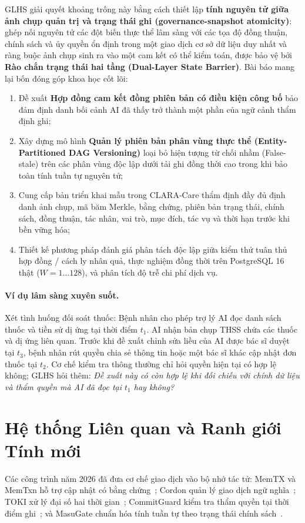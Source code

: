\documentclass[11pt]{article}
\begin{document}
GLHS giải quyết khoảng trống này bằng cách thiết lập \textbf{tính nguyên tử giữa ảnh chụp quản trị và trạng thái ghi (governance-snapshot atomicity)}: ghép nối nguyên tử các đột biến thực thể lâm sàng với các tọa độ đồng thuận, chính sách và ủy quyền ổn định trong một giao dịch cơ sở dữ liệu duy nhất và ràng buộc ảnh chụp sinh ra vào một cam kết có thể kiểm toán, được bảo vệ bởi \textbf{Rào chắn trạng thái hai tầng (Dual-Layer State Barrier)}. Bài báo mang lại bốn đóng góp khoa học cốt lõi:
\begin{enumerate}
    \item Đề xuất \textbf{Hợp đồng cam kết đồng phiên bản có điều kiện công bố} bảo đảm định danh bối cảnh AI đã thấy trở thành một phần của ngữ cảnh thẩm định ghi;
    \item Xây dựng mô hình \textbf{Quản lý phiên bản phân vùng thực thể (Entity-Partitioned DAG Versioning)} loại bỏ hiện tượng từ chối nhầm (False-stale) trên các phân vùng độc lập dưới tải ghi đồng thời cao trong khi bảo toàn tính tuần tự nguyên tử;
    \item Cung cấp bản triển khai mẫu trong CLARA-Care thẩm định đầy đủ định danh ảnh chụp, mã băm Merkle, bằng chứng, phiên bản trạng thái, chính sách, đồng thuận, tác nhân, vai trò, mục đích, tác vụ và thời hạn trước khi bền vững hóa;
    \item Thiết kế phương pháp đánh giá phân tách độc lập giữa kiểm thử tuân thủ hợp đồng / cách ly nhân quả, thực nghiệm đồng thời trên PostgreSQL 16 thật ($W=1 \dots 128$), và phân tích độ trễ chi phí dịch vụ.
\end{enumerate}

\paragraph{Ví dụ lâm sàng xuyên suốt.} Xét tình huống đối soát thuốc: Bệnh nhân cho phép trợ lý AI đọc danh sách thuốc và tiền sử dị ứng tại thời điểm $t_1$. AI nhận bản chụp THSS chứa các thuốc và dị ứng liên quan. Trước khi đề xuất chỉnh sửa liều của AI được bác sĩ duyệt tại $t_3$, bệnh nhân rút quyền chia sẻ thông tin hoặc một bác sĩ khác cập nhật đơn thuốc tại $t_2$. Cơ chế kiểm tra thông thường chỉ hỏi quyền hiện tại có hợp lệ không; GLHS hỏi thêm: \emph{Đề xuất này có còn hợp lệ khi đối chiếu với chính dữ liệu và thẩm quyền mà AI đã đọc tại $t_1$ hay không?}

\section{Hệ thống Liên quan và Ranh giới Tính mới}
Các công trình năm 2026 đã đưa cơ chế giao dịch vào bộ nhớ tác tử: MemTX và MemTxn hỗ trợ cập nhật có bằng chứng~\cite{memtx,memtxn}; Cordon quản lý giao dịch ngữ nghĩa~\cite{cordon}; TOKI xử lý đại số hai thời gian~\cite{toki}; CommitGuard kiểm tra thẩm quyền tại thời điểm ghi~\cite{temporaryauth}; và MasuGate chuẩn hóa tính tuần tự theo trạng thái chính sách~\cite{statefulgov}.
\end{document}
